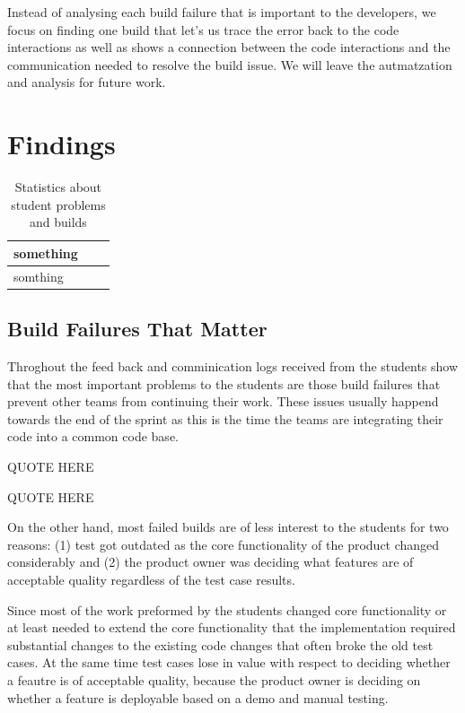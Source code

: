 Instead of analysing each build failure that is important to the developers, we focus on finding one build that let's us trace the error back to the code interactions as well as shows a connection between the code interactions and the communication needed to resolve the build issue.
We will leave the autmatzation and analysis for future work.

\section{Findings}
\begin{table}[tb]
\centering
\begin{tabular}{lll}
\toprule
something\\
\midrule
somthing\\
\bottomrule
\end{tabular}
\label{tab:}
\caption{Statistics about student problems and builds}
\end{table}

\subsection{Build Failures That Matter}
Throghout the feed back and comminication logs received from the students show that the most important problems to the students are those build failures that prevent other teams from continuing their work.
These issues usually happend towards the end of the sprint as this is the time the teams are integrating their code into a common code base.

QUOTE HERE

QUOTE HERE

On the other hand, most failed builds are of less interest to the students for two reasons: 
(1) test got outdated as the core functionality of the product changed considerably 
and (2) the product owner was deciding what features are of acceptable quality regardless of the test case results.

Since most of the work preformed by the students changed core functionality or at least needed to extend the core functionality that the implementation required substantial changes to the existing code changes that often broke the old test cases.
At the same time test cases lose in value with respect to deciding whether a feautre is of acceptable quality, because the product owner is deciding on whether a feature is deployable based on a demo and manual testing.

